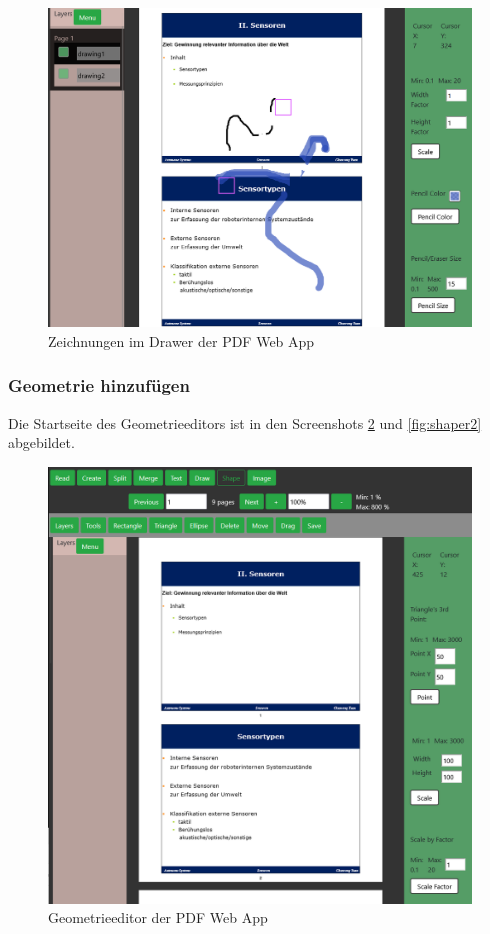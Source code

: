 \begin{figure}[!htbp]
	\centering
	\includegraphics[width=1\textwidth]{"images/drawing.png"}
	\caption{Zeichnungen im Drawer der PDF Web App}
	\label{fig:drawing}
\end{figure}


\subsubsection{Geometrie hinzufügen}
Die Startseite des Geometrieeditors ist in den Screenshots \ref{fig:shaper} und \ref{fig:shaper2} abgebildet. 

\begin{figure}[!htbp]
	\centering
	\includegraphics[width=1\textwidth]{"images/shaper.png"}
	\caption{Geometrieeditor der PDF Web App}
	\label{fig:shaper}
\end{figure}

